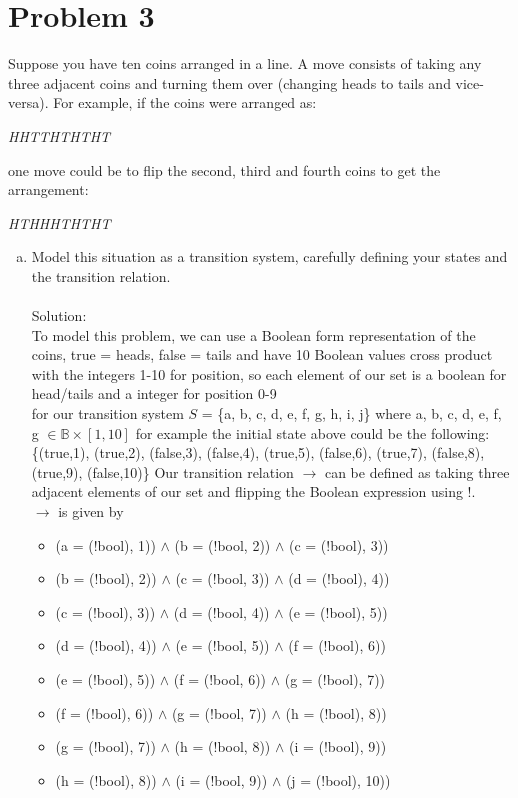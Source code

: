 \documentclass{article}
\newcommand*\moveToRight[1]{\hspace*{0em plus 1fill}\makebox{(#1)}}
\begin{document}
\section{Problem 3}
Suppose you have ten coins arranged in a line. A move consists of taking any three adjacent coins and turning them over (changing heads to tails and vice-versa). For example, if the coins were arranged as:
\begin{center}\textit{HHTTHTHTHT}\end{center}
one move could be to flip the second, third and fourth coins to get the arrangement:
\begin{center}\textit{HTHHHTHTHT}\end{center}
\begin{enumerate}[(a)]
    \item Model this situation as a transition system, carefully defining your states and the transition relation. \moveToRight{4 marks}\\\\
    Solution:\\
    To model this problem, we can use a Boolean form representation of the coins, true = heads, false = tails and have 10 Boolean values cross product with the integers 1-10 for position, so each element of our set is a boolean for head/tails and a integer for position 0-9
    \\for our transition system
    $S$ = \{a, b, c, d, e, f, g, h, i, j\} where a, b, c, d, e, f, g $\in \mathbb{B}\times[1,10]$ 
    for example the initial state above could be the following:\\
    \{(true,1), (true,2), (false,3), (false,4), (true,5), (false,6), (true,7), (false,8), (true,9), (false,10)\}
    Our transition relation $\rightarrow$ can be defined as taking three adjacent elements of our set and flipping the Boolean expression using !.\\
    $\rightarrow$ is given by
    \begin{itemize}
        \item (a = (!bool), 1)) $\land$ (b = (!bool, 2)) $\land$ (c = (!bool), 3))
        \item (b = (!bool), 2)) $\land$ (c = (!bool, 3)) $\land$ (d = (!bool), 4))
        \item (c = (!bool), 3)) $\land$ (d = (!bool, 4)) $\land$ (e = (!bool), 5))
        \item (d = (!bool), 4)) $\land$ (e = (!bool, 5)) $\land$ (f = (!bool), 6))
        \item (e = (!bool), 5)) $\land$ (f = (!bool, 6)) $\land$ (g = (!bool), 7))
        \item (f = (!bool), 6)) $\land$ (g = (!bool, 7)) $\land$ (h = (!bool), 8))
        \item (g = (!bool), 7)) $\land$ (h = (!bool, 8)) $\land$ (i = (!bool), 9))
        \item (h = (!bool), 8)) $\land$ (i = (!bool, 9)) $\land$ (j = (!bool), 10))
    \end{itemize}
    

\end{enumerate}
\end{document}
